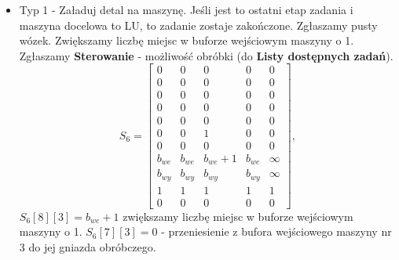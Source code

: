 \documentclass[10pt, a4paper]{article}
\begin{document}
\begin{itemize}
\begin{equation*}
\begin{array}{ccccc}
0 & 0 & 1 & 0 & 0\\
0 & 0 & 1 & 0& 0\\
b_{we}& b_{we}& b_{we}& b_{we} & \infty\\
b_{wy}& b_{wy}& b_{wy}& b_{wy} & \infty\\
1& 1& 1& 1 & 1\\
0 & 0 & 0 & 0 & 0
\end{array}\right],
\end{equation*}
$S_5[3][3]=0$, $S_5[6][3]=1$ mamy pusty wózek przy maszynie nr 3, $S_5[7][3]=1$ mamy detal w buforze wejściowym maszyny nr 3.
\item Typ 1 - Załaduj detal na maszynę. Jeśli jest to ostatni etap zadania i maszyna docelowa to LU, to zadanie zostaje zakończone. Zgłaszamy pusty wózek. Zwiększamy liczbę miejsc w buforze wejściowym maszyny o 1. Zgłaszamy \textbf{Sterowanie} - możliwość obróbki (do \textbf{Listy dostępnych zadań}).
\begin{equation*}
S_6=\left[\begin{array}{ccccc}
0 & 0 & 0 & 0&0\\
0 & 0 & 0 & 0 & 0\\
0 & 0 & 0 & 0& 0\\
0 & 0 & 0 & 0& 0\\
0 & 0 & 0 & 0& 0\\
0 & 0 & 1 & 0 & 0\\
0 & 0 & 0 & 0& 0\\
b_{we}& b_{we}& b_{we}+1& b_{we} & \infty\\
b_{wy}& b_{wy}& b_{wy}& b_{wy} & \infty\\
1& 1& 1& 1 & 1\\
0 & 0 & 0 & 0 & 0
\end{array}\right],
\end{equation*}
$S_6[8][3]=b_{we}+1$ zwiększamy liczbę miejsc w buforze wejściowym maszyny o 1. $S_6[7][3]=0$ - przeniesienie z bufora wejściowego maszyny nr 3 do jej gniazda obróbczego.



\end{itemize}
\end{document}
